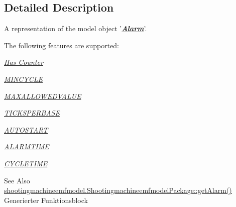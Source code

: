 \subsection{Detailed Description}
A representation of the model object '{\itshape {\bfseries \hyperlink{interfaceshootingmachineemfmodel_1_1_alarm}{Alarm}}}'.

The following features are supported\-: 
\begin{DoxyItemize}
\item \hyperlink{interfaceshootingmachineemfmodel_1_1_alarm_a442e899482a13941a48d3921b5892265}{{\itshape Has Counter}} 
\item \hyperlink{interfaceshootingmachineemfmodel_1_1_alarm_a0fbebe94ea5a08f4ad9bace4563bd149}{{\itshape M\-I\-N\-C\-Y\-C\-L\-E}} 
\item \hyperlink{interfaceshootingmachineemfmodel_1_1_alarm_a63e36037c1877c380b5494f1a05dce5e}{{\itshape M\-A\-X\-A\-L\-L\-O\-W\-E\-D\-V\-A\-L\-U\-E}} 
\item \hyperlink{interfaceshootingmachineemfmodel_1_1_alarm_ada895bdbb794428a1f71ba70acaf7fa3}{{\itshape T\-I\-C\-K\-S\-P\-E\-R\-B\-A\-S\-E}} 
\item \hyperlink{interfaceshootingmachineemfmodel_1_1_alarm_a8c57a5583c781aa422d21e13be557d70}{{\itshape A\-U\-T\-O\-S\-T\-A\-R\-T}} 
\item \hyperlink{interfaceshootingmachineemfmodel_1_1_alarm_a186180990a9c00307acdcd4d6dbf4c9e}{{\itshape A\-L\-A\-R\-M\-T\-I\-M\-E}} 
\item \hyperlink{interfaceshootingmachineemfmodel_1_1_alarm_a11fdadcd243369f06f69c66230f1a831}{{\itshape C\-Y\-C\-L\-E\-T\-I\-M\-E}} 
\end{DoxyItemize}

\begin{DoxySeeAlso}{See Also}
\hyperlink{interfaceshootingmachineemfmodel_1_1_shootingmachineemfmodel_package_a83b49bdf97b3b7cd20f8051e755a3b17}{shootingmachineemfmodel.\-Shootingmachineemfmodel\-Package\-::get\-Alarm()}  Generierter Funktionsblock 
\end{DoxySeeAlso}


